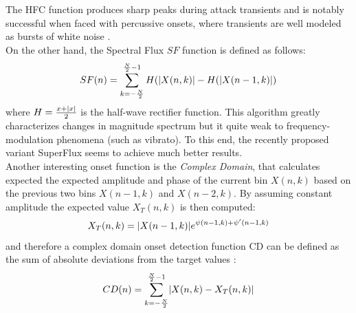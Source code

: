 The HFC function produces sharp peaks during attack transients and is notably successful when faced with percussive onsets, where transients are well modeled as bursts of white noise \cite{bello05}.\\
On the other hand, the Spectral Flux $SF$ function is defined as follows:
\begin{equation}
SF(n) = \sum\limits_{k=-\frac{N}{2}}^{\frac{N}{2}-1} H(\lvert X(n, k)\rvert - H(\lvert X(n - 1, k)\rvert)
\end{equation}
where $H = \frac{x + \lvert x\rvert}{2}$ is the half-wave rectifier function. This algorithm greatly characterizes changes in magnitude spectrum but it quite weak to frequency-modulation phenomena (such as vibrato). To this end, the recently proposed variant SuperFlux \cite{bock13} seems to achieve much better results. \\
Another interesting onset function is the \textit{Complex Domain}, that calculates expected the expected amplitude and phase of the current bin $X(n, k)$ based on the previous two bins $X(n - 1, k)$ and $X(n -2, k)$. By assuming constant amplitude the expected value $X_T(n, k)$ is then computed:
\begin{equation}
X_T(n, k) = \lvert X(n - 1, k)\rvert e^{\psi (n - 1, k) + \psi ' (n - 1, k)} 
\end{equation}
and therefore a complex domain onset detection function CD can be defined as the sum of absolute deviations from the target values \cite{dixon06}:
\begin{equation}
CD(n) = \sum\limits_{k=-\frac{N}{2}}^{\frac{N}{2}-1} \lvert X(n, k)-X_T(n,k)\rvert
\end{equation}

